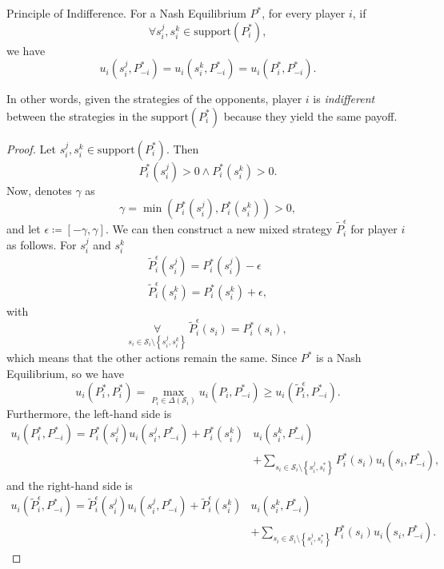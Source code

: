 \begin{theorem}
	Principle of Indifference. For a Nash Equilibrium \(P^{*}\), for every player \(i\), if
	\[
		\forall s_{i}^j, s_{i}^k\in \text{support}(P_{i}^{*}),
	\]
	we have
	\[
		u_{i}(s_{i}^j, P_{-i}^{*}) = u_{i}(s_{i}^k, P_{-i}^{*}) = u_{i}(P_{i}^*, P_{-i}^{*}).
	\]
\end{theorem}
\begin{intuition}
	In other words, given the strategies of the opponents, player \(i\) is \emph{indifferent} between the strategies in the \(\mathrm{support}(P_{i}^{*}) \)
	because they yield the same payoff.
\end{intuition}
\begin{proof}
	Let \(s_{i}^j, s_{i}^k\in \mathrm{support}(P_i^{*}) \). Then
	\[
		P_i^{*}(s_{i}^j)>0\land P_i^{*}(s_{i}^k)>0.
	\]
	Now, denotes \(\gamma\) as
	\[
		\gamma = \min\left(P_i^{*}(s_{i}^j), P_i^{*}(s_{i}^k)\right)>0,
	\]
	and let \(\epsilon\coloneqq \left[-\gamma, \gamma\right]\). We can then construct a new mixed strategy \(\widetilde{P}_{i}^{\epsilon}\)
	for player \(i\) as follows. For \(s_{i}^j\) and \(s_{i}^k\)
	\[
		\begin{split}
			\widetilde{P}_{i}^{\epsilon}(s_{i}^j) = P_i^{*}(s_{i}^j)- \epsilon\\
			\widetilde{P}_{i}^{\epsilon}(s_{i}^k) = P_i^{*}(s_{i}^k)+\epsilon,
		\end{split}
	\]
	with
	\[
		\underset{s_{i}\in \mathcal{S}_{i}\setminus\left\{s_{i}^j, s_{i}^k\right\}}{\forall} \ \widetilde{P}_{i}^{\epsilon}(s_{i}) = P_i^{*}(s_{i}),
	\]
	which means that the other actions remain the same. Since \(P^{*}\) is a Nash Equilibrium, so we have
	\[
		u_{i}\left(P^{*}_i, P_{i}^{*}\right) = \max_{P_{i}\in \Delta(\mathcal{S}_{i})} u_{i}(P_{i}, P_{-i}^{*}) \geq u_{i}(\widetilde{P}_{i}^{\epsilon}, P_{-i}^{*}).
	\]
	Furthermore, the left-hand side is
	\[
		\begin{split}
			u_{i}\left(P^{*}_i, P_{-i}^{*}\right) = P_{i}^{*}(s_{i}^j)u_{i}(s_{i}^j, P^{*}_{-i}) + P^{*}_{i}(s_{i}^{k})&u_{i}(s_{i}^{k}, P^{*}_{-i})\\
			&+ \sum\limits_{ s_{i}\in \mathcal{S}_{i}\setminus\left\{s_{i}^j, s_{i}^*\right\}} P^{*}_{i}(s_{i})u_{i}(s_{i}, P^{*}_{-i}),
		\end{split}
	\]
	and the right-hand side is
	\[
		\begin{split}
			u_{i}\left(\widetilde{P}^{\epsilon}_i, P_{-i}^{*}\right) = \widetilde{P}_{i}^{\epsilon}(s_{i}^j)u_{i}(s_{i}^j, P^{*}_{-i}) + \widetilde{P}^{\epsilon}_{i}(s_{i}^{k})&u_{i}(s_{i}^{k}, P^{*}_{-i})\\
			&+ \sum\limits_{ s_{i}\in \mathcal{S}_{i}\setminus\left\{s_{i}^j, s_{i}^*\right\}} P^{*}_{i}(s_{i})u_{i}(s_{i}, P^{*}_{-i}).
		\end{split}
	\]


\end{proof}
